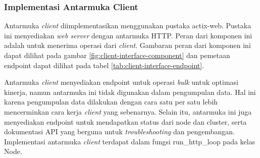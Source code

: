 \subsubsection{Implementasi Antarmuka Client}
\label{subsubsection:implementasi-antarmuka-client}

Antarmuka \textit{client} diimplementasikan menggunakan pustaka actix-web. Pustaka ini menyediakan \textit{web server} dengan antarmuka HTTP. Peran dari komponen ini adalah untuk menerima operasi dari \textit{client}. Gambaran peran dari komponen ini dapat dilihat pada gambar \ref{fig:client-interface-component} dan pemetaan endpoint dapat dilihat pada tabel \ref{tab:client-interface-endpoint}.

\begin{table}[h]
    \centering
    \caption{Endpoint dari Antarmuka Client}
    \label{tab:client-interface-endpoint}
\end{table}

Antarmuka \textit{client} menyediakan endpoint untuk operasi \textit{bulk} untuk optimasi kinerja, namun antarmuka ini tidak digunakan dalam pengumpulan data. Hal ini karena pengumpulan data dilakukan dengan cara satu per satu lebih mencerminkan cara kerja \textit{client} yang sebenarnya. Selain itu, antarmuka ini juga menyediakan endpoint untuk mendapatkan status dari node dan cluster, serta dokumentasi API yang berguna untuk \textit{troubleshooting} dan pengembangan. Implementasi antarmuka \textit{client} terdapat dalam fungsi run\_http\_loop pada kelas Node.
